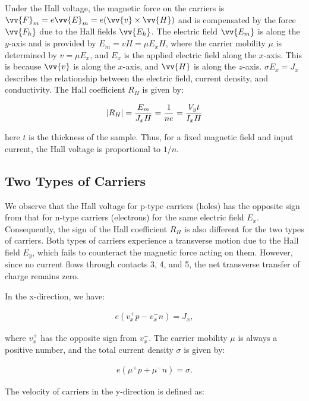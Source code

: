 Under the Hall voltage, the magnetic force on the carriers is $\vv{F}_m=e\vv{E}_m=e(\vv{v}\times\vv{H})$ and is compensated by the force $\vv{F_h}$ due to the Hall fields $\vv{E_h}$. The electric field $\vv{E_m}$ is along the $y$-axis and is provided by $E_m = vH = \mu E_x H$, where the carrier mobility $\mu$ is determined by $v = \mu E_x$, and $E_x$ is the applied electric field along the $x$-axis. This is because $\vv{v}$ is along the $x$-axis, and $\vv{H}$ is along the $z$-axis. $\sigma E_x = J_x$ describes the relationship between the electric field, current density, and conductivity. The Hall coefficient $R_H$ is given by:

\begin{align}
    \label{eq:1}
    \abs{R_H}=\frac{E_m}{J_xH}=\frac{1}{ne}=\frac{V_y t}{I_xH}
\end{align}

here $t$ is the thickness of the sample. Thus, for a fixed magnetic field and input current, the Hall voltage is proportional to $1/n$.

\subsection{Two Types of Carriers}
We observe that the Hall voltage for p-type carriers (holes) has the opposite sign from that for n-type carriers (electrons) for the same electric field $E_x$. Consequently, the sign of the Hall coefficient $R_H$ is also different for the two types of carriers. Both types of carriers experience a transverse motion due to the Hall field $E_y$, which fails to counteract the magnetic force acting on them. However, since no current flows through contacts 3, 4, and 5, the net transverse transfer of charge remains zero.

In the x-direction, we have:

\begin{align}
    e(v^+_xp-v^-_xn)=J_x,
    \label{eq:x_direction}
\end{align}

where $v^+_x$ has the opposite sign from $v^-_x$. The carrier mobility $\mu$ is always a positive number, and the total current density $\sigma$ is given by:

\begin{align}
    e(\mu^+p+\mu^-n)=\sigma.
    \label{eq:total_current_density}
\end{align}

The velocity of carriers in the y-direction is defined as:

